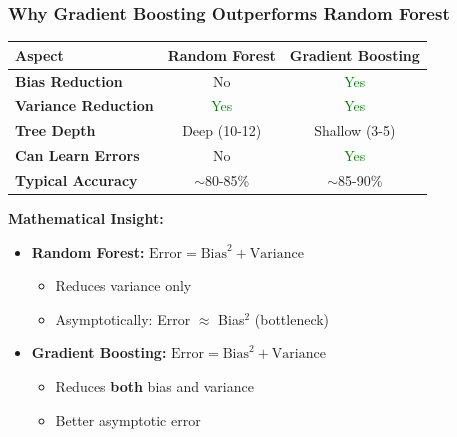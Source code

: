 \documentclass{beamer}
\begin{document}
\begin{frame}[fragile]
\frametitle{Why Gradient Boosting Outperforms Random Forest}

\begin{center}
{\small
\begin{tabular}{|l|c|c|}
\hline
\textbf{Aspect} & \textbf{Random Forest} & \textbf{Gradient Boosting} \\
\hline
\textbf{Bias Reduction} & No & \textcolor{green}{Yes} \\
\hline
\textbf{Variance Reduction} & \textcolor{green}{Yes} & \textcolor{green}{Yes} \\
\hline
\textbf{Tree Depth} & Deep (10-12) & Shallow (3-5) \\
\hline
\textbf{Can Learn Errors} & No & \textcolor{green}{Yes} \\
\hline
\textbf{Typical Accuracy} & $\sim$80-85\% & $\sim$85-90\% \\
\hline
\end{tabular}
}
\end{center}

\vspace{0.4cm}
\textbf{Mathematical Insight:}

\begin{itemize}
    \item \textbf{Random Forest:} $\text{Error} = \text{Bias}^2 + \text{Variance}$
    \begin{itemize}
        \item Reduces variance only
        \item Asymptotically: Error $\approx$ Bias$^2$ (bottleneck)
    \end{itemize}

    \item \textbf{Gradient Boosting:} $\text{Error} = \text{Bias}^2 + \text{Variance}$
    \begin{itemize}
        \item Reduces \textbf{both} bias and variance
        \item Better asymptotic error
    \end{itemize}
\end{itemize}

\end{frame}
\end{document}
